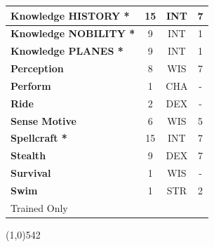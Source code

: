 \documentclass[letterpaper]{article}
\newcommand{\fullline}{\noindent\line(1,0){542} \\}
\begin{document}
\begin{table}[h!]
{{\begin{tabular}{l  c  c  c}
        \textbf{Knowledge {\scriptsize HISTORY} *} & 15 & {\footnotesize INT} & 7 \\
        \hline
        \textbf{Knowledge {\scriptsize NOBILITY} *} & 9 & {\footnotesize INT} & 1 \\
        \textbf{Knowledge {\scriptsize PLANES} *} & 9 & {\footnotesize INT} & 1 \\
        \hline
        \textbf{Perception} & 8 & {\footnotesize WIS} & 7 \\
        \textbf{Perform} & 1 & {\footnotesize CHA} & - \\
        \hline
        \textbf{Ride} & 2 & {\footnotesize DEX} & - \\
        \textbf{Sense Motive} & 6 & {\footnotesize WIS} & 5 \\
        \hline
        \textbf{Spellcraft *} & 15 & {\footnotesize INT} & 7 \\
        \textbf{Stealth} & 9 & {\footnotesize DEX} & 7 \\
        \hline
        \textbf{Survival} & 1 & {\footnotesize WIS} & - \\
        \textbf{Swim} & 1 & {\footnotesize STR} & 2 \\
        {\footnotesize * Trained Only} \\
        \end{tabular}
    }
}
\vspace{-1.5em}
\end{table} \par

\vspace{-1.5em}
\fullline
\vspace{-1em}
\end{document}
